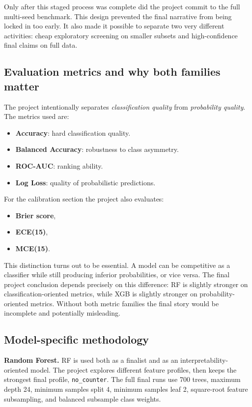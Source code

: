 \documentclass[11pt,a4paper]{article}
\begin{document}
Only after this staged process was complete did the project commit to the full multi-seed benchmark. This design prevented the final narrative from being locked in too early. It also made it possible to separate two very different activities: cheap exploratory screening on smaller subsets and high-confidence final claims on full data.

\subsection{Evaluation metrics and why both families matter}
The project intentionally separates \emph{classification quality} from \emph{probability quality}. The metrics used are:
\begin{itemize}
    \item \textbf{Accuracy}: hard classification quality.
    \item \textbf{Balanced Accuracy}: robustness to class asymmetry.
    \item \textbf{ROC-AUC}: ranking ability.
    \item \textbf{Log Loss}: quality of probabilistic predictions.
\end{itemize}

For the calibration section the project also evaluates:
\begin{itemize}
    \item \textbf{Brier score},
    \item \textbf{ECE(15)},
    \item \textbf{MCE(15)}.
\end{itemize}

This distinction turns out to be essential. A model can be competitive as a classifier while still producing inferior probabilities, or vice versa. The final project conclusion depends precisely on this difference: RF is slightly stronger on classification-oriented metrics, while XGB is slightly stronger on probability-oriented metrics. Without both metric families the final story would be incomplete and potentially misleading.

\subsection{Model-specific methodology}
\textbf{Random Forest.} RF is used both as a finalist and as an interpretability-oriented model. The project explores different feature profiles, then keeps the strongest final profile, \texttt{no\_counter}. The full final runs use 700 trees, maximum depth 24, minimum samples split 4, minimum samples leaf 2, square-root feature subsampling, and balanced subsample class weights.
\end{document}
